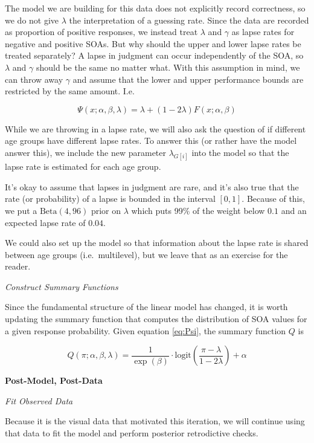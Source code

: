 \documentclass[11pt, oneside, openany]{scrbook}
\begin{document}
The model we are building for this data does not explicitly record correctness, so we do not give \(\lambda\) the interpretation of a guessing rate. Since the data are recorded as proportion of positive responses, we instead treat \(\lambda\) and \(\gamma\) as lapse rates for negative and positive SOAs. But why should the upper and lower lapse rates be treated separately? A lapse in judgment can occur independently of the SOA, so \(\lambda\) and \(\gamma\) should be the same no matter what. With this assumption in mind, we can throw away \(\gamma\) and assume that the lower and upper performance bounds are restricted by the same amount. I.e.

\begin{equation}
  \Psi(x; \alpha, \beta, \lambda) = \lambda + (1 - 2\lambda) F(x; \alpha, \beta)
  \label{eq:Psi}
\end{equation}

While we are throwing in a lapse rate, we will also ask the question of if different age groups have different lapse rates. To answer this (or rather have the model answer this), we include the new parameter \(\lambda_{G[i]}\) into the model so that the lapse rate is estimated for each age group.

It's okay to assume that lapses in judgment are rare, and it's also true that the rate (or probability) of a lapse is bounded in the interval \([0, 1]\). Because of this, we put a \(\mathrm{Beta(4, 96)}\) prior on \(\lambda\) which puts 99\% of the weight below \(0.1\) and an expected lapse rate of \(0.04\).

We could also set up the model so that information about the lapse rate is shared between age groups (i.e.~multilevel), but we leave that as an exercise for the reader.

\emph{Construct Summary Functions}

Since the fundamental structure of the linear model has changed, it is worth updating the summary function that computes the distribution of SOA values for a given response probability. Given equation \eqref{eq:Psi}, the summary function \(Q\) is

\[
Q(\pi; \alpha, \beta, \lambda) = \frac{1}{\exp(\beta)} \cdot \mathrm{logit}\left(\frac{\pi - \lambda}{1-2\lambda}\right) + \alpha
\]

\textbf{Post-Model, Post-Data}

\emph{Fit Observed Data}

Because it is the visual data that motivated this iteration, we will continue using that data to fit the model and perform posterior retrodictive checks.
\end{document}
